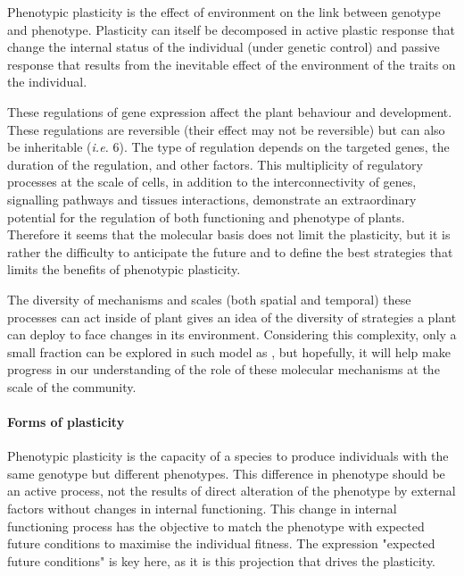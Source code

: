 \begin{fullwidth}
\begin{tcolorbox}[title=Molecular basis of phenotypic plasticity]
{\footnotesize     Phenotypic plasticity is the effect of environment on the link between genotype and phenotype. Plasticity can itself be decomposed in active plastic response that change the internal status of the individual (under genetic control) and passive response that results from the inevitable effect of the environment of the traits on the individual.}
   
   \label{fig:plasticity_form}

These regulations of gene expression affect the plant behaviour and development. These regulations are reversible (their effect may not be reversible) but can also be inheritable (\textit{i.e.} 6). The type of regulation depends on the targeted genes, the duration of the regulation, and other factors. This multiplicity of regulatory processes at the scale of cells, in addition to the interconnectivity of genes, signalling pathways and tissues interactions, demonstrate an extraordinary potential for the regulation of both functioning and phenotype of plants. Therefore it seems that the molecular basis does not limit the plasticity, but it is rather the difficulty to anticipate the future and to define the best strategies that limits the benefits of phenotypic plasticity.

The diversity of mechanisms and scales (both spatial and temporal) these processes can act inside of plant gives an idea of the diversity of strategies a plant can deploy to face changes in its environment. Considering this complexity, only a small fraction can be explored in such model as \model, but hopefully, it will help make progress in our understanding of the role of these molecular mechanisms at the scale of the community.
\end{tcolorbox}
\end{fullwidth}






\paragraph{Forms of plasticity}
Phenotypic plasticity is the capacity of a species to produce individuals with the same genotype but different phenotypes. This difference in phenotype should be an active process, not the results of direct alteration of the phenotype by external factors without changes in internal functioning. This change in internal functioning process has the objective  to match the phenotype with expected future conditions to maximise the individual fitness. The expression "expected future conditions" is key here, as it is this projection that drives the plasticity.

